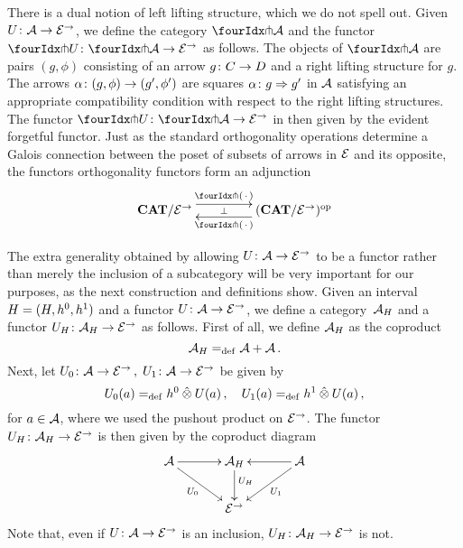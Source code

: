 \documentclass[reqno,10pt,a4paper,oneside]{amsart}
\begin{document}
There is a dual notion of left lifting structure, which we do not spell out. Given $U \co \cal{A} \to \catE^\to$, we define the category $\liftr{\cal{A}}$ and the functor   $\liftr{U} \co \liftr{\cal{A}} \to \catE^\to$ as follows. The objects of
$ \liftr{\cal{A}}$ are pairs $(g, \phi)$ consisting of an arrow $g \co C \to D$ and a right lifting structure for $g$.
The arrows $\alpha \co (g, \phi) \to (g', \phi')$ are squares $\alpha \co g \Rightarrow g'$ in $\cal{A}$ satisfying an appropriate compatibility condition with respect to the right lifting structures. The functor $\liftr{U} \co \liftr{\cal{A}} \to \catE^\to$ in then given by the evident forgetful functor.  Just as the standard orthogonality operations determine a Galois connection between the poset of subsets of arrows in $\catE$ and its opposite, the functors orthogonality functors form an adjunction 
\begin{equation}
\label{garner-adjunction}
\begin{gathered}
\xymatrix@C+2em{
  \CAT/\catE^{\to}
  \ar@<5pt>[r]^-{\liftl{\brarghole}}
  \ar@{}[r]|-{\bot}
&
  (\CAT/\catE^{\to})^{\op}
  \ar@<5pt>[l]^-{\liftr{\brarghole}}
}
\end{gathered}
\end{equation}

The extra generality obtained by allowing $U \co \cal{A} \to \catE^\to$ to be a functor rather than merely the 
inclusion of a  subcategory will be very important for our purposes, as the next construction and definitions
show. Given an interval $\interval = (\interval, \intervall, \intervalr)$ and a functor $U \co \cal{A} \to \catE^\to$,
we define a category~$\cal{A}_\interval$ and a functor $U_\interval \co \cal{A}_\interval \to \catE^\to$ as follows. First of all, we define $\cal{A}_\interval$ as the coproduct
 \[
 \cal{A}_\interval  \defeq \cal{A} + \cal{A} \, .
 \] 
 Next, let $U_{0} \co \cal{A} \to \catE^\to \, , \; U_{1} \co \cal{A} \to \catE^\to$ be given by
 \[
U_{0}(a) \defeq  \intervall \hatotimes U(a) \, , \quad
U_{1}(a) \defeq  \intervalr \hatotimes U(a) \, , 
\]
for $a \in \cal{A}$, where we used the pushout product on $\catE^\to$. The functor $U_\interval \co \cal{A}_\interval \to \catE^\to$ is then given by the coproduct diagram
\[
\xymatrix@C=1.2cm{
\cal{A} \ar[r] \ar[dr]_-{U_0} & \cal{A}_\interval \ar[d]^(.4){U_\interval} & \cal{A} \ar[dl]^-{U_1} \ar[l] \\ 
 & \catE^\to }
\]
Note that, even if $U \co \cal{A} \to \catE^\to$ is an inclusion, $U_\interval \co \cal{A}_\interval \to \catE^\to$ is not.
\end{document}
